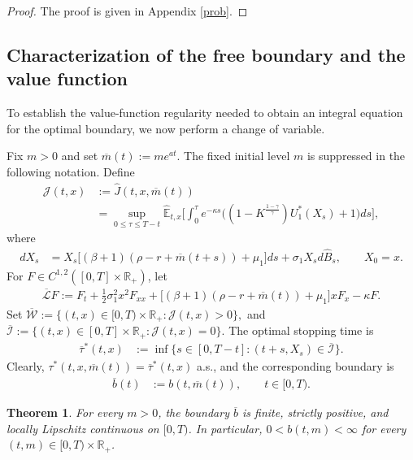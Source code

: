 \documentclass[a4paper,11pt]{amsart}
\numberwithin{equation}{section}
\newtheorem{theorem}{Theorem}[section]
\newcommand{\blue}[1]{{\color{black}#1}}
\begin{document}
{\begin{proof}
The proof is given in Appendix \ref{prob}.
\end{proof}

\subsection{Characterization of the free boundary and the value function}
\blue{To establish the value-function regularity needed to obtain an integral equation for the optimal boundary, we now perform a change of variable.}
{\color{black}
{\color{black}
Fix $m>0$ and set $\overline m(t):=me^{at}$. The fixed initial level $m$ is suppressed in the following notation. Define
\begin{align*}
\mathcal J(t,x)&:=\widehat J(t,x,\overline m(t))\\
&=\sup_{0\leq\tau\leq T-t}\widehat{\mathbb E}_{t,x}\bigg[\int_0^\tau e^{-\kappa s}\Big((1-K^{\frac{1-\gamma}{\gamma}})U_1^\ast(X_s)+1\Big)ds\bigg],\tag{\theequation}\label{mathcalJ}
\end{align*}
where
\begin{align*}
dX_s&=X_s\Big[(\beta+1)(\rho-r+\overline m(t+s))+\mu_1\Big]ds+\sigma_1X_sd\widehat B_s,\qquad X_0=x.
\end{align*}
}
For $F\in C^{1,2}([0,T]\times\mathbb R_+)$, let
\begin{align*}
\overline{\mathcal L}F:=F_t+\frac{1}{2}\sigma_1^2x^2F_{xx}+\Big[(\beta+1)(\rho-r+\overline m(t))+\mu_1\Big]xF_x-\kappa F.
\end{align*}
Set $\overline{\mathcal W}:=\{(t,x)\in[0,T)\times\mathbb R_+:\mathcal J(t,x)>0\},$ and 
$\overline{\mathcal I}:=\{(t,x)\in[0,T]\times\mathbb R_+:\mathcal J(t,x)=0\}.$ The optimal stopping time is 
\begin{align*}
\overline\tau^\ast(t,x)&:=\inf\{s\in[0,T-t]:(t+s,X_s)\in\overline{\mathcal I}\}.
\end{align*}
Clearly, $\tau^\ast(t,x,\overline{m}(t))=\overline{\tau}^\ast(t,x)$ a.s., and the corresponding boundary is 
\begin{align*}
	\overline b(t)&:=b(t,\overline m(t)),\qquad t\in[0,T).
\end{align*}

\begin{theorem}\label{lipschitz}
For every $m>0$, the boundary $\overline b$ is finite, strictly positive, and locally Lipschitz continuous on $[0,T)$. In particular, $0<b(t,m)<\infty$ for every $(t,m)\in[0,T)\times\mathbb R_+$.
\end{theorem}

}}
\end{document}
